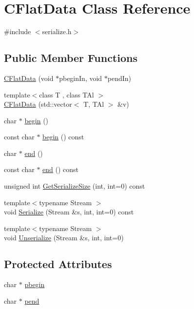 \hypertarget{class_c_flat_data}{}\section{C\+Flat\+Data Class Reference}
\label{class_c_flat_data}


{\ttfamily \#include $<$serialize.\+h$>$}

\subsection*{Public Member Functions}
\begin{DoxyCompactItemize}
\item 
\hyperlink{class_c_flat_data_afd4036c45c69e6b080f57d793e1bdf57}{C\+Flat\+Data} (void $\ast$pbegin\+In, void $\ast$pend\+In)
\item 
{\footnotesize template$<$class T , class T\+Al $>$ }\\\hyperlink{class_c_flat_data_aa536a3fe59b6cde08cf7ed57ecebedfb}{C\+Flat\+Data} (std\+::vector$<$ T, T\+Al $>$ \&v)
\item 
char $\ast$ \hyperlink{class_c_flat_data_ac8131cc3aec84905d7786fb19ff8953d}{begin} ()
\item 
const char $\ast$ \hyperlink{class_c_flat_data_abf086875237d322ea9aa4f3e6ac371e4}{begin} () const 
\item 
char $\ast$ \hyperlink{class_c_flat_data_ae88ae9f4121ff18aa8e29a3a40d7ee67}{end} ()
\item 
const char $\ast$ \hyperlink{class_c_flat_data_a3619008f211e2f02873cf37e597b64af}{end} () const 
\item 
unsigned int \hyperlink{class_c_flat_data_a9205cfe1bca792dd8605ed8cf4f2d7b7}{Get\+Serialize\+Size} (int, int=0) const 
\item 
{\footnotesize template$<$typename Stream $>$ }\\void \hyperlink{class_c_flat_data_a99e4a9e9c2c68ea484a102b8f08a7c5a}{Serialize} (Stream \&s, int, int=0) const 
\item 
{\footnotesize template$<$typename Stream $>$ }\\void \hyperlink{class_c_flat_data_a3da79327bf2937113de502182ee227b9}{Unserialize} (Stream \&s, int, int=0)
\end{DoxyCompactItemize}
\subsection*{Protected Attributes}
\begin{DoxyCompactItemize}
\item 
char $\ast$ \hyperlink{class_c_flat_data_ad5f93a9d4e1cc71eb5fc94e9c9d4d89d}{pbegin}
\item 
char $\ast$ \hyperlink{class_c_flat_data_add53aa6440254a30392bcf660f3f8057}{pend}
\end{DoxyCompactItemize}


